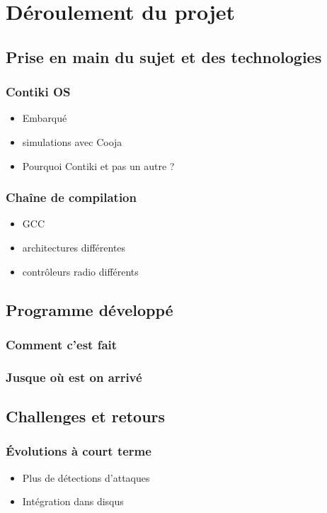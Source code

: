 \chapter{Déroulement du projet}
\label{sec:deroulement}

\section{Prise en main du sujet et des technologies}
	
	\subsection{Contiki OS}
		\begin{itemize}
			\item Embarqué
			\item simulations avec Cooja
			\item Pourquoi Contiki et pas un autre ?
		\end{itemize}
	
	\subsection{Chaîne de compilation}
		\begin{itemize}
			\item GCC
			\item architectures différentes
			\item contrôleurs radio différents
		\end{itemize}

\section{Programme développé}
	\subsection{Comment c'est fait}
	\subsection{Jusque où est on arrivé}

\section{Challenges et retours}
	\subsection{Évolutions à court terme}
		\begin{itemize}
			\item Plus de détections d'attaques
			\item Intégration dans disqus
		\end{itemize}
